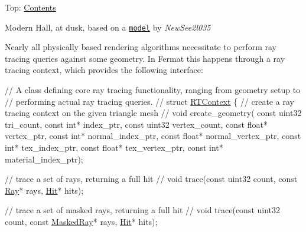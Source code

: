 Top\+: \hyperlink{_overture_contents_page}{Contents}

 \begin{DoxyParagraph}{}

\footnotesize \textquotesingle{}Modern Hall, at dusk\textquotesingle{}, based on a \href{http://www.blendswap.com/blends/view/51997}{\tt model} by {\itshape New\+See2l035}
\normalsize 
\end{DoxyParagraph}
\begin{DoxyParagraph}{}
Nearly all physically based rendering algorithms necessitate to perform ray tracing queries against some geometry. In Fermat this happens through a ray tracing context, which provides the following interface\+: ~\newline

\begin{DoxyCode}
\textcolor{comment}{// A class defining core ray tracing functionality, ranging from geometry setup to}
\textcolor{comment}{// performing actual ray tracing queries.}
\textcolor{comment}{//}
\textcolor{keyword}{struct }\hyperlink{struct_r_t_context}{RTContext}
\{
   \textcolor{comment}{// create a ray tracing context on the given triangle mesh}
   \textcolor{comment}{//}
   \textcolor{keywordtype}{void} create\_geometry(
       \textcolor{keyword}{const} uint32    tri\_count,
       \textcolor{keyword}{const} \textcolor{keywordtype}{int}*      index\_ptr,
       \textcolor{keyword}{const} uint32    vertex\_count,
       \textcolor{keyword}{const} \textcolor{keywordtype}{float}*    vertex\_ptr,
       \textcolor{keyword}{const} \textcolor{keywordtype}{int}*      normal\_index\_ptr,
       \textcolor{keyword}{const} \textcolor{keywordtype}{float}*    normal\_vertex\_ptr,
       \textcolor{keyword}{const} \textcolor{keywordtype}{int}*      tex\_index\_ptr,
       \textcolor{keyword}{const} \textcolor{keywordtype}{float}*    tex\_vertex\_ptr,
       \textcolor{keyword}{const} \textcolor{keywordtype}{int}*      material\_index\_ptr);

   \textcolor{comment}{// trace a set of rays, returning a full hit}
   \textcolor{comment}{//}
   \textcolor{keywordtype}{void} trace(\textcolor{keyword}{const} uint32 count, \textcolor{keyword}{const} \hyperlink{struct_ray}{Ray}* rays, \hyperlink{struct_hit}{Hit}* hits);

   \textcolor{comment}{// trace a set of masked rays, returning a full hit}
   \textcolor{comment}{//}
   \textcolor{keywordtype}{void} trace(\textcolor{keyword}{const} uint32 count, \textcolor{keyword}{const} \hyperlink{struct_masked_ray}{MaskedRay}* rays, \hyperlink{struct_hit}{Hit}* hits);


\end{DoxyCode}
\end{DoxyParagraph}
